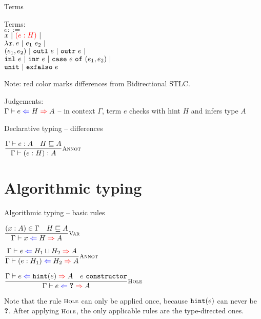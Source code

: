 \documentclass{beamer}
\begin{document}
\begin{frame}{Terms}

Terms: \\
$e ::=$ \\
\qquad $x \pipe \termdiff{\annot{e}{H}} \pipe $ \\
\qquad $\fun{x}{e} \pipe \app{e_1}{e_2} \pipe$ \\
\qquad $\pair{e_1}{e_2} \pipe \outl{e} \pipe \outr{e} \pipe$ \\
\qquad $\inl{e} \pipe \inr{e} \pipe \case{e}{e_1}{e_2} \pipe$ \\
\qquad $\unit \pipe \exfalso{e}$

\vspace{2em}

Note: red color marks differences from Bidirectional STLC.

\vspace{2em}

Judgements: \\
$\fullhinting{\Gamma}{e}{H}{A}$ -- in context $\Gamma$, term $e$ checks with hint $H$ and infers type $A$

\end{frame}

\begin{frame}{Declarative typing -- differences}

\begin{center}
  $\infrule[Annot]{\typing{e}{A} \quad \sidecond{\hintorder{H}{A}}}{\typing{\annot{e}{H}}{A}}$
\end{center}

\end{frame}

\section{Algorithmic typing}

\begin{frame}{Algorithmic typing -- basic rules}

\begin{center}
  $\infrule[Var]{\sidecond{(x : A) \in \Gamma} \quad \sidecond{\hintorder{H}{A}}}{\hinting{x}{H}{A}}$

  \vspace{2em}

  $\infrule[Annot]{\hinting{e}{\hintlub{H_1}{H_2}}{A}}{\hinting{\annot{e}{H_1}}{H_2}{A}}$

  \vspace{2em}

  $\infrule[Hole]{\hinting{e}{\hintfor{e}}{A} \quad \sidecond{e\ \texttt{constructor}}}{\hinting{e}{\Hole}{A}}$
\end{center}

\vspace{2em}

Note that the rule $\rulename{Hole}$ can only be applied once, because $\hintfor{e}$ can never be $\Hole$. After applying $\rulename{Hole}$, the only applicable rules are the type-directed ones.

\end{frame}
\end{document}

